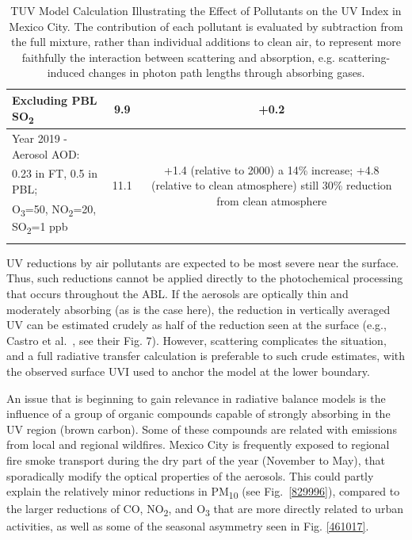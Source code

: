 \documentclass[10pt]{article}
\begin{document}
\begin{table}[H]
\begin{tabular}{lcc}
    Excluding PBL SO\textsubscript{2} & 9.9                               & +0.2                                                                                                                                       \\\hline
    Year 2019 - Aerosol AOD:          & \multirow{4}{*}{11.1}             & \multirow{4}{5cm}{+1.4 (relative to 2000) a 14\% increase; +4.8 (relative to clean atmosphere) still 30\% reduction from clean atmosphere} \\
    0.23 in FT, 0.5 in PBL;                                                                                                                                                                                            \\ O\textsubscript{3}=50, NO\textsubscript{2}=20, SO\textsubscript{2}=1 ppb\\ &&\\\hline
  \end{tabular}
  \caption{{TUV Model Calculation Illustrating the Effect of Pollutants on the UV Index in Mexico City. The contribution of each pollutant is evaluated by subtraction from the full mixture, rather than individual additions to clean air, to represent more faithfully the interaction between scattering and absorption, e.g. scattering-induced changes in photon path lengths through absorbing gases.}}
  \label{table:TUVmodel}
\end{table}

UV reductions by air pollutants are expected to be most severe near the
surface. Thus, such reductions cannot be applied directly to the
photochemical processing that occurs throughout the ABL. If the aerosols
are optically thin and moderately absorbing (as is the case here), the
reduction in vertically averaged UV can be estimated crudely as half of
the reduction seen at the surface (e.g., Castro et
al.~\cite{Castro_2001}, see their Fig. 7). However, scattering
complicates the situation, and a full radiative transfer calculation is
preferable to such crude estimates, with the observed surface UVI used
to anchor the model at the lower boundary.

An issue that is beginning to gain relevance in radiative balance models
is the influence of a group of organic compounds capable of strongly
absorbing in the UV region (brown carbon).\cite{Laskin_2015} Some of
these compounds are related with emissions from local and regional
wildfires.\cite{Gadhavi_2010} Mexico City is frequently exposed to
regional fire smoke transport during the dry part of the year (November
to May)\cite{Rios_2019}, that sporadically modify the optical
properties of the aerosols.\cite{Barnard_2008} This could partly explain
the relatively minor reductions in PM\textsubscript{10} (see
Fig.~{\ref{829996}}), compared to the larger reductions
of CO, NO\textsubscript{2}, and O\textsubscript{3} that are more
directly related to urban activities, as well as some of the seasonal
asymmetry seen in Fig. {\ref{461017}}. ~
\end{document}
